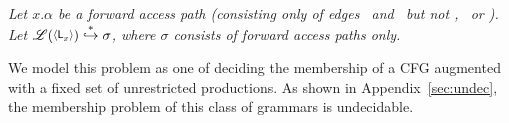 \documentclass[9pt,nonatbib]{sigplanconf}
\newcommand{\added}[1]{{\color{Myblue}{#1}}}
\begin{document}
{\em
Let $x.\alpha$ be a forward access path (consisting only
of edges  \acar\ and \acdr\  but not \bcar,  \bcdr\ or
\clazy).       Let      $\mathscr{L}(\var{\Lanv{x}{}})
\stackrel{*}{\hookrightarrow}  \sigma$, where  $\sigma$
consists  of  forward  access  paths  only.  \added{Then  is
$\alpha \in \sigma$?}
}

We model this problem as one of deciding the membership of a CFG
augmented with a fixed set of unrestricted productions. As shown in
Appendix~\ref{sec:undec}, the membership problem of this class of
grammars is undecidable.







\end{document}
